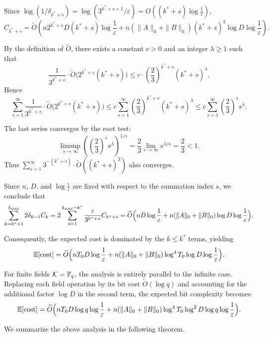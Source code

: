 \documentclass{article}
\numberwithin{equation}{section}
\begin{document}
Since $\log(1/\delta_{k^*+s}) = \log(3^{k^*+s+1}/\varepsilon) = O((k^*+s)\log\frac{1}{\varepsilon})$,
\[
C_{k^*+s} = \widetilde{O}\!\left(
n 2^{k^*+s} D (k^*+s) \log\frac{1}{\varepsilon}
+ n(\|A\|_0 + \|B\|_0) (k^*+s)^3 \log D \log\frac{1}{\varepsilon}
\right).
\]

By the definition of $\widetilde{O}$, there exists a constant $c > 0$ and an integer $\lambda \ge 1$ such that
\[
\frac{1}{3^{k^*+s}} \cdot \widetilde{O}\bigl(2^{k^*+s} (k^*+s)\bigr)
\le c \cdot \left(\frac{2}{3}\right)^{k^*+s} (k^*+s)^{\lambda}.
\]
Hence
\[
\sum_{s=1}^{\infty} \frac{1}{3^{k^*+s}} \cdot \widetilde{O}\bigl(2^{k^*+s} (k^*+s)\bigr)
\le c \sum_{s=1}^{\infty} \left(\frac{2}{3}\right)^{k^*+s} (k^*+s)^{\lambda}
\le c \sum_{s=1}^{\infty} \left(\frac{2}{3}\right)^s s^{\lambda}.
\]

The last series converges by the root test:
\[
\limsup_{s \to \infty} \left( \left(\frac{2}{3}\right)^s s^{\lambda} \right)^{1/s}
= \frac{2}{3} \lim_{s \to \infty} s^{\lambda/s}
= \frac{2}{3} < 1.
\]
Thus $\sum_{s=1}^{\infty} 3^{-(k^*+s)} \cdot \widetilde{O}((k^*+s)^3)$ also converges.

Since $n$, $D$, and $\log\frac{1}{\varepsilon}$ are fixed with respect to the summation index $s$, we conclude that
\[
\sum_{k=k^*+1}^{k_{\max}} 2\delta_{k-1} C_k
= 2 \sum_{s=1}^{k_{\max}-k^*} \frac{\varepsilon}{3^{k^*+s}} C_{k^*+s}
= \widetilde{O}\Bigl( nD\log\frac{1}{\varepsilon} + n(\|A\|_0 + \|B\|_0) \log D \log\frac{1}{\varepsilon} \Bigr).
\]

Consequently, the expected cost is dominated by the $k \le k^*$ terms, yielding
\[
\mathbb{E}[\text{cost}]
= \widetilde{O}\Bigl(
n T_0 D \log\frac{1}{\varepsilon}
+ n(\|A\|_0 + \|B\|_0) \log^4 T_0 \log D \log\frac{1}{\varepsilon}
\Bigr).
\]


For finite fields ${\mathcal{K}} = \mathbb{F}_q$, the analysis is entirely parallel to the infinite case. Replacing each field operation by its bit cost $\widetilde{O}(\log q)$ and accounting for the additional factor $\log D$ in the second term, the expected bit complexity becomes
\[
\mathbb{E}[\text{cost}]
= \widetilde{O}\Bigl(
n T_0 D \log q \log\frac{1}{\varepsilon}
+ n(\|A\|_0 + \|B\|_0) \log^4 T_0 \log^2 D \log q \log\frac{1}{\varepsilon}
\Bigr).
\]


We summarize the above analysis in the following theorem.
\end{document}
